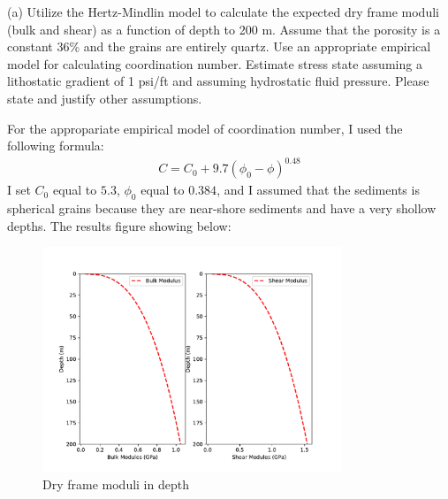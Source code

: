 \begin{problem}{(a)}
    Utilize the Hertz-Mindlin model to calculate the expected dry frame moduli (bulk and shear) as a function of depth to 200 m. Assume that the porosity is a constant 36\% and the grains are entirely quartz. Use an appropriate empirical model for calculating coordination number. Estimate stress state assuming a lithostatic gradient of 1 psi/ft and assuming hydrostatic fluid pressure. Please state and justify other assumptions.
\end{problem}
\begin{solution}
    For the appropariate empirical model of coordination number, I used the following formula:
    \begin{align}
        C = C_0 + 9.7 (\phi_0 - \phi)^{0.48}
        \label{equ:Cn}
    \end{align}
    I set $C_0$ equal to $5.3$, $\phi_0$ equal to $0.384$,
    and I assumed that the sediments is spherical grains because they are near-shore sediments and have a very shollow depths. 
    The results figure showing below:
    \begin{figure}[h]
        \centering
        \includegraphics[width=0.8\textwidth]{figures/homework-2/p1-1-a.pdf}
        \caption{Dry frame moduli in depth}
        \label{fig:p1-1-a}
    \end{figure}
\end{solution}


